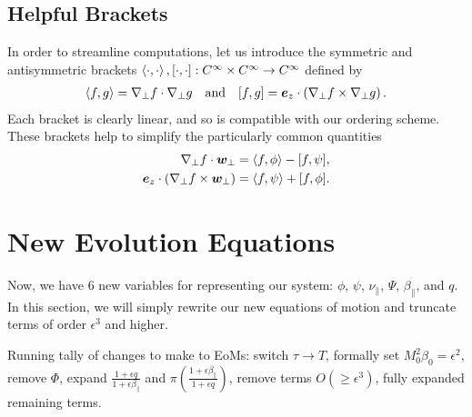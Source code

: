 \documentclass{article}
\newcommand{\para}{\parallel}
\newcommand{\ep}{\epsilon}
\newcommand{\np}{\nabla_\perp}
\newcommand{\fr}{\frac{1+\ep q}{1+\ep\beta_\para}}
\newcommand{\frinv}{\frac{1+\ep\beta_\para}{1+\ep q}}
\newcommand{\pth} [1] {\left( #1 \right) }
\newcommand{\br} [1] {\left[ #1 \right] }
\begin{document}
\subsection{Helpful Brackets}
In order to streamline computations, let us introduce the symmetric and antisymmetric brackets $\Braket{\cdot,\cdot}, [\cdot,\cdot]: C^\infty\times C^\infty\to C^\infty$ defined by 
\begin{align}
    \Braket{f,g} = \np f\cdot \np g && \text{and} && \br{f,g} = \bm{e}_z\cdot\pth{\np f \times \np g}. 
\end{align}
Each bracket is clearly linear, and so is compatible with our ordering scheme. These brackets help to simplify the particularly common quantities
\begin{align}
    \np f\cdot \bm{w}_\perp &= \Braket{f, \phi} - [f, \psi], \\ 
    \bm{e}_z \cdot (\np f \times\bm{w}_\perp) &= \Braket{f, \psi} + [f, \phi]. 
\end{align}


\section{New Evolution Equations}
Now, we have 6 new variables for representing our system: $\phi$, $\psi$, $\nu_\para$, $\Psi$, $\beta_\para$, and $q$. In this section, we will simply rewrite our new equations of motion and truncate terms of order $\ep^3$ and higher. 

Running tally of changes to make to EoMs: switch $\tau\to T$, formally set $M_0^2\beta_0=\ep^2$, remove $\Phi$, expand $\fr$ and $\pi\pth{\frinv}$, remove terms $O\pth{\geq\ep^3}$, fully expanded remaining terms. 
\end{document}
